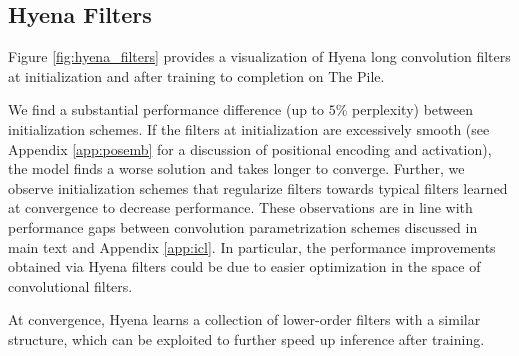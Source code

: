 \clearpage 

\subsection{Hyena Filters}

Figure \ref{fig:hyena_filters} provides a visualization of {\sf Hyena} long convolution filters at initialization and after training to completion on {\sc The Pile}. 

 We find a substantial performance difference (up to $5\%$ perplexity) between initialization schemes. If the filters at initialization are excessively smooth (see Appendix \ref{app:posemb} for a discussion of positional encoding and activation), the model finds a worse solution and takes longer to converge. Further, we observe initialization schemes that regularize filters towards typical filters learned at convergence to decrease performance. These observations are in line with performance gaps between convolution parametrization schemes discussed in main text and Appendix \ref{app:icl}. In particular, the performance improvements obtained via {\sf Hyena} filters could be due to easier optimization in the space of convolutional filters.


%
 At convergence, {\sf Hyena} learns a collection of lower-order filters with a similar structure, which can be exploited to further speed up inference after training. 

